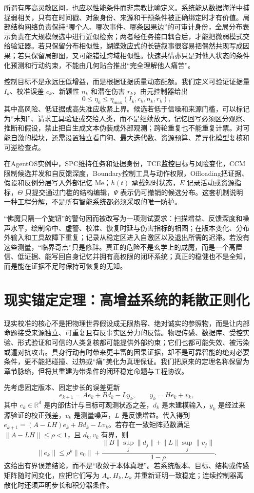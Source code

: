 所谓有序高灵敏区间，也应以性能条件而非宗教比喻定义。系统能从数据海洋中捕捉弱相关，只有在时间戳、对象身份、来源和干预条件被正确绑定时才有价值。局部结构网络负责保持“哪个人、哪次事件、哪条因果边”的可审计身份，全局分布表示负责在大规模候选中进行近似检索；两者经任务接口耦合后，才能把微弱模式交给验证器。若只保留分布相似性，蝴蝶效应式的长链叙事很容易把偶然共现写成因果；若只保留局部图，又可能错过跨域相似性。快速共情亦只是对他人状态的条件化预测和行动约束，不能由几何贴合推出“完全理解他人痛苦”。

控制目标不是永远压低增益，而是根据证据质量动态配额。我们定义可验证证据量 $I_k$、校准误差 $c_k$、新颖性 $n_k$ 和潜在伤害 $r_k$，由元控制器给出
\[
0\leq\eta_k\leq\eta_{\max}(I_k,c_k,n_k,r_k),
\]
其中高风险、低证据或高失准应收紧上界。候选若低于信噪和来源门槛，可以标记为“未知”、请求工具验证或交给人类，而不是继续放大。记忆回写必须区分观察、推断和假设，禁止把自生成文本伪装成外部观测；跨轮重复也不能重复计票。对可能自激的模块，还需设置独立看门狗、最大迭代数、资源预算、差异化模型复核和可逆检查点。

在AgentOS实例中，SPC维持任务和证据身份，TCE监控目标与风险变化，CCM限制候选并发和自反馈深度，Boundary控制工具与动作权限，Offloading把证据、假设和反例分层写入外部记忆 $\mathrm{Me}$；$h(t)$ 承载短时状态，$E$ 记录活动或资源指标，$\Theta$ 只提交通过门槛的结构编辑，$\Psi$ 表示仍可撤销的候选分布。这套机制说明一种工程分解，不是所有智能系统都必须采取的唯一防护。

“佛魔只隔一个旋钮”的警句因而被改写为一项测试要求：扫描增益、反馈深度和噪声水平，绘制命中、虚警、校准、恢复时延与伤害指标的相图；在版本变化、分布外输入和工具故障下重复；记录从稳定区进入自激区以及退出所需的迟滞。若没有这些测量，“临界奇点”只是修辞。真正的危险不是玄学上的成魔，而是一个高置信、低证据、能写回自身记忆并拥有高权限的闭环系统；真正的稳健也不是全知，而是能在证据不足时保持可恢复的无知。

\section{现实锚定定理：高增益系统的耗散正则化}
\label{sec:section_9982}
现实校准的核心不是把物理世界假设成无限热容、绝对诚实的参照物，而是让内部命题接受来源独立、可重复且有反事实区分力的反馈。物理传感、数据库、受控实验、形式验证和可信的人类复核都可能提供外部约束；它们也都可能失效、被污染或遭对抗攻击。具身行动有时带来更丰富的因果证据，却不是可靠智能的绝对必要条件，更不能把碰撞、过热或“痛”美化为真理保证。我们把原来的定理名称保留为章节脉络，但将其重建为带条件的闭环稳定命题与工程协议。

先考虑固定版本、固定步长的误差更新
\[
e_{k+1}=A e_k+B d_k-L y_k,
\qquad y_k=H e_k+v_k,
\]
其中 $e_k\in\mathbb R^d$ 是内部估计与目标可观测状态之差，$d_k$ 是未建模输入，$y_k$ 是经过来源验证的校正残差，$v_k$ 是测量噪声，$L$ 是反馈增益。代入得到 $e_{k+1}=(A-LH)e_k+B d_k-Lv_k$。若存在一致矩阵范数满足 $\|A-LH\|\leq\rho<1$，且 $d_k,v_k$ 有界，则
\[
\|e_k\|\leq \rho^k\|e_0\|+
\frac{\|B\|\sup_j\|d_j\|+\|L\|\sup_j\|v_j\|}{1-\rho}.
\]
这给出有界误差结论，而不是“收敛于本体真理”。若系统版本、目标、结构或传感矩阵随时间变化，应把它们写为 $A_k,H_k,L_k$ 并重新证明一致稳定；连续控制器离散化时还须声明步长和积分器条件。

